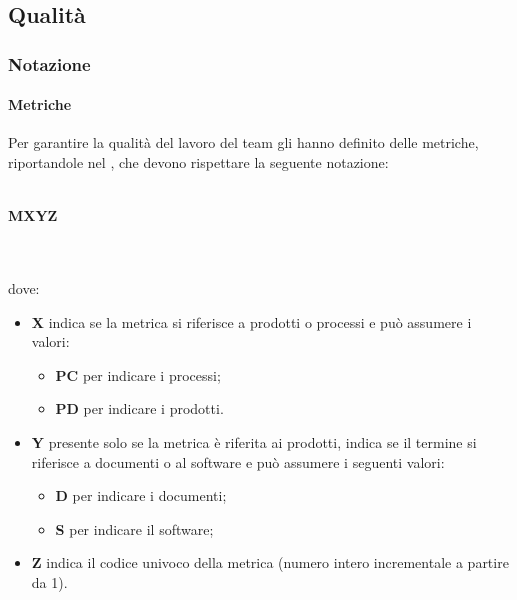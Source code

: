 \subsection{Qualità}
\subsubsection{Notazione}
\paragraph{Metriche}
Per garantire la qualità del lavoro del team gli \AMMP{} hanno definito delle metriche, riportandole
nel \PQdoc, che devono rispettare la seguente notazione:\\ \\
\centerline{\textbf{M\textbraceleft{}X\textbraceright{}\textbraceleft{}Y\textbraceright{}\textbraceleft{}Z\textbraceright{}}} \\ \\
dove:
\begin{itemize}
	\item \textbf{X} indica se la metrica si riferisce a prodotti o processi e può assumere
	i valori:
	\begin{itemize}
		\item \textbf{PC} per indicare i processi;
		\item \textbf{PD} per indicare i prodotti.
	\end{itemize}
	\item \textbf{Y} presente solo se la metrica è riferita ai prodotti, indica se il termine  si riferisce a documenti o al software e può assumere i seguenti valori:
	\begin{itemize}
		\item \textbf{D} per indicare i documenti;
		\item \textbf{S} per indicare il software;
	\end{itemize}
	\item \textbf{Z} indica il codice univoco della metrica (numero intero incrementale a partire da 1).
\end{itemize}
